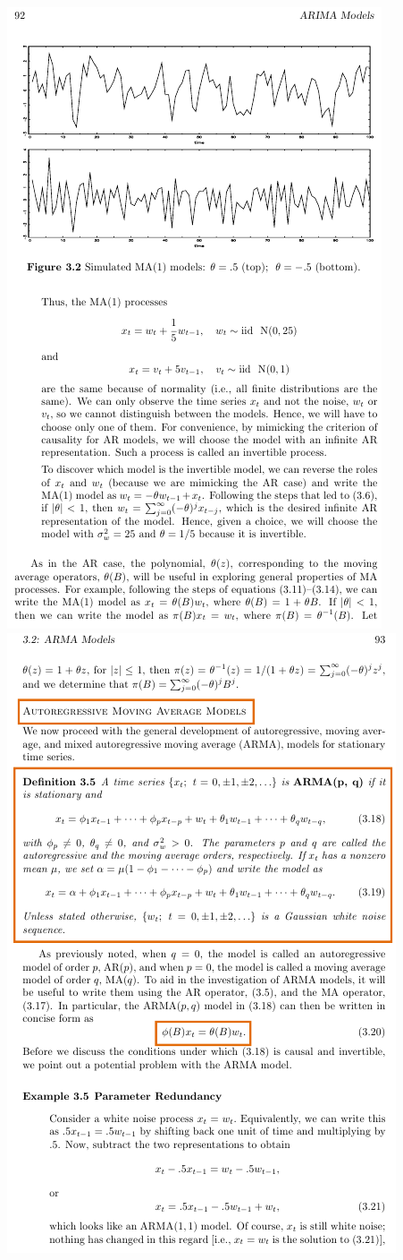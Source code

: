 \documentclass{article}
\begin{document}
\newpage\includegraphics[width=.9\textwidth]{shumway9}
\newpage\includegraphics[width=.9\textwidth]{shumway10}
\end{document}

